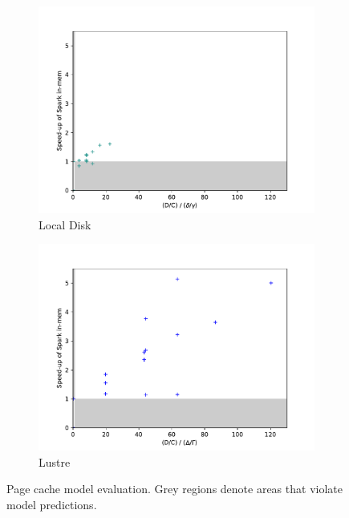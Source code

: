 \begin{figure}
\begin{subfigure}{0.5\linewidth}
\centering
    \includegraphics[width=\textwidth]{figures/inmem/local-incrementation.pdf}
\caption{Local Disk}
\label{fig:inmem:modeleval-local}
    \end{subfigure}%
\begin{subfigure}{0.5\linewidth}
\centering
    \includegraphics[width=\textwidth]{figures/inmem/lustre-incrementation.pdf}
\caption{Lustre}
\label{fig:inmem:modeleval-lustre}
\end{subfigure}
\setlength{\belowcaptionskip}{-10pt}
    \caption{Page cache model evaluation. Grey regions denote areas that violate
             model predictions.}
\label{fig:inmem:modeleval}
\end{figure}

